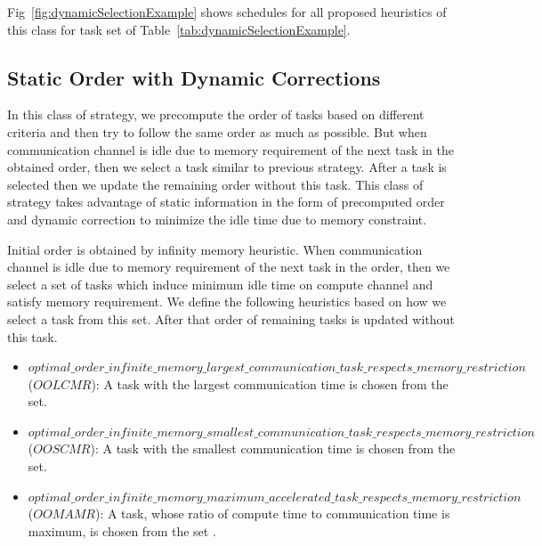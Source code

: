 \documentclass[runningheads]{llncs} %
\begin{document}
Fig~\ref{fig:dynamicSelectionExample} shows schedules for all proposed heuristics of this class for task set of Table~\ref{tab:dynamicSelectionExample}.

\subsection{Static Order with Dynamic Corrections}

In this class of strategy, we precompute the order of tasks based on different criteria and then try to follow the same order as much as possible. But when communication channel is idle due to memory requirement of the next task in the obtained order, then we select a task similar to previous strategy. After a task is selected then we update the remaining order without this task. This class of strategy takes advantage of  static information in the form of precomputed order and dynamic correction to minimize the idle time due to memory constraint.

Initial order is obtained by infinity memory heuristic. When communication channel is idle due to memory requirement of the next task in the order, then we select a set of tasks which induce minimum idle time on compute channel and satisfy memory requirement. We define the following heuristics based on how we select a task from this set. After that order of remaining  tasks is updated without this task.

\begin{itemize}[a)]
	\item $optimal\_order\_infinite\_memory\_largest\_communication\_task\_respects\_memory\_restriction$ ($OOLCMR$): A task with the largest communication time is chosen from the set.
	\item $optimal\_order\_infinite\_memory\_smallest\_communication\_task\_respects\_memory\_restriction$ ($OOSCMR$):  A task with the smallest communication time is chosen from the set.
	\item $optimal\_order\_infinite\_memory\_maximum\_accelerated\_task\_respects\_memory\_restriction$ ($OOMAMR$): A task,  whose ratio of compute time to communication time is maximum, is chosen from the set .
\end{itemize}
\end{document}
